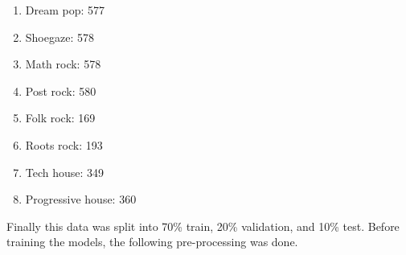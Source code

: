 \documentclass[letterpaper, 12 pt, conference]{ieeeconf}  %
\begin{document}
\begin{enumerate}
    \item Dream pop: 577
    \item Shoegaze: 578
    \item Math rock: 578
    \item Post rock: 580
    \item Folk rock: 169       
    \item Roots rock: 193
    \item Tech house: 349
    \item Progressive house: 360
\end{enumerate}

Finally this data was split into 70\% train, 20\% validation, and 10\% test. Before training the models, the following pre-processing was done.


 



\end{document}
